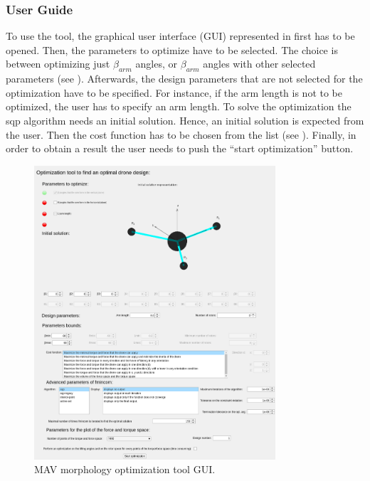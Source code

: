 \subsubsection{User Guide}
\label{sec:user_guide}
To use the tool, the graphical user interface (GUI) represented in 
first has to be opened. Then, the parameters to optimize have to be selected. The
choice is between optimizing just $\beta_{arm}$ angles, or $\beta_{arm}$ angles with other
selected parameters (see ). Afterwards, the design parameters that
are not selected for the optimization have to be specified. For instance, if the arm
length is not to be optimized, the user has to specify an arm length. To solve the
optimization the sqp algorithm needs an initial solution. Hence, an initial solution
is expected from the user. Then the cost function has to be chosen from the list
(see ). Finally, in order to obtain a result the user needs to
push the “start optimization” button.

\begin{figure}[!h]
  \centering
  \includegraphics[width=0.8\textwidth]{images/gui.png}
  \caption{MAV morphology optimization tool GUI.}
  \label{fig:gui}
\end{figure}

